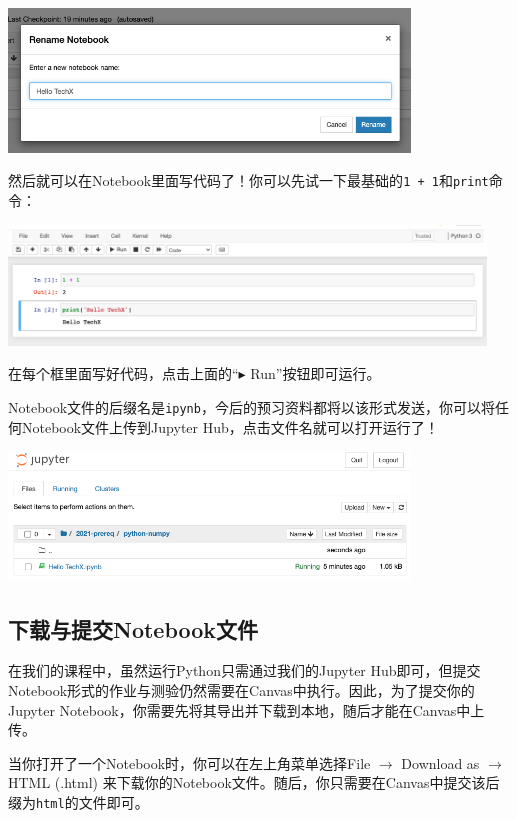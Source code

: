 \documentclass{article}
\begin{document}
\vspace*{0.3cm}\centerline{\noindent\includegraphics[width=0.8\textwidth]{ipynb-rename.png}}

然后就可以在Notebook里面写代码了！你可以先试一下最基础的\texttt{1 + 1}和\texttt{print}命令：

\vspace*{0.3cm}\centerline{\noindent\includegraphics[width=0.95\textwidth]{ipynb-code.png}}

在每个框里面写好代码，点击上面的“$\blacktriangleright$ Run”按钮即可运行。

Notebook文件的后缀名是\texttt{ipynb}，今后的预习资料都将以该形式发送，你可以将任何Notebook文件上传到Jupyter Hub，点击文件名就可以打开运行了！

\vspace*{0.3cm}\centerline{\noindent\includegraphics[width=0.8\textwidth]{ipynb-open.png}}

  \newpage
  \subsection{下载与提交Notebook文件}
  在我们的课程中，虽然运行Python只需通过我们的Jupyter Hub即可，但提交Notebook形式的作业与测验仍然需要在Canvas中执行。因此，为了提交你的Jupyter Notebook，你需要先将其导出并下载到本地，随后才能在Canvas中上传。
  
  当你打开了一个Notebook时，你可以在左上角菜单选择File $\rightarrow$ Download as $\rightarrow$ HTML (.html) 来下载你的Notebook文件。随后，你只需要在Canvas中提交该后缀为\texttt{html}的文件即可。
  
\end{document}
